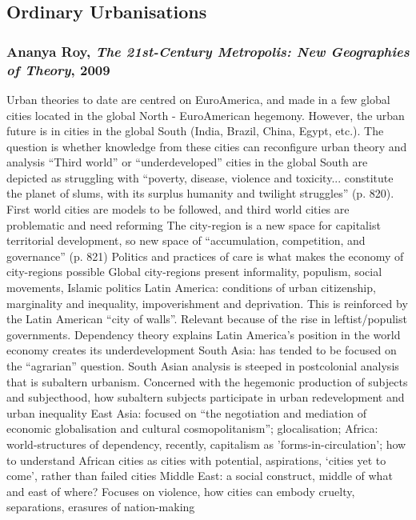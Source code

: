\documentclass{article}
\begin{document}
\subsection{Ordinary Urbanisations}

\subsubsection{Ananya Roy, \textit{The 21st-Century Metropolis: New Geographies of Theory}, 2009}

\begin{outline}
	\1 Urban theories to date are centred on EuroAmerica, and made in a few global cities located in the global North - EuroAmerican hegemony. However, the urban future is in cities in the global South (India, Brazil, China, Egypt, etc.). The question is whether knowledge from these cities can reconfigure urban theory and analysis
	\1 ``Third world'' or ``underdeveloped'' cities in the global South are depicted as struggling with ``poverty, disease, violence and toxicity... constitute the planet of slums, with its surplus humanity and twilight struggles'' (p. 820). First world cities are models to be followed, and third world cities are problematic and need reforming
	\1 The city-region is a new space for capitalist territorial development, so new space of ``accumulation, competition, and governance'' (p. 821)
		\2 Politics and practices of care is what makes the economy of city-regions possible
		\2 Global city-regions present informality, populism, social movements, Islamic politics
	\1 Latin America: conditions of urban citizenship, marginality and inequality, impoverishment and deprivation. This is reinforced by the Latin American ``city of walls''. Relevant because of the rise in leftist/populist governments. Dependency theory explains Latin America's position in the world economy creates its underdevelopment
	\1 South Asia: has tended to be focused on the ``agrarian'' question. South Asian analysis is steeped in postcolonial analysis that is subaltern urbanism. Concerned with the hegemonic production of subjects and subjecthood, how subaltern subjects participate in urban redevelopment and urban inequality
	\1 East Asia: focused on ``the negotiation and mediation of economic globalisation and cultural cosmopolitanism''; glocalisation; 
	\1 Africa: world-structures of dependency, recently, capitalism as 'forms-in-circulation'; how to understand African cities as cities with potential, aspirations, `cities yet to come', rather than failed cities
	\1 Middle East: a social construct, middle of what and east of where? Focuses on violence, how cities can embody cruelty, separations, erasures of nation-making

\end{outline}
\end{document}
